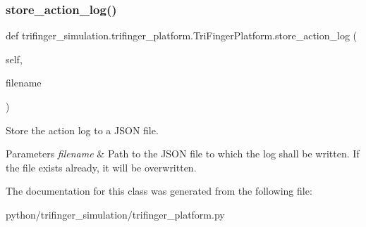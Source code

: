 \subsubsection{\texorpdfstring{store\+\_\+action\+\_\+log()}{store\_action\_log()}}
{\footnotesize\ttfamily def trifinger\+\_\+simulation.\+trifinger\+\_\+platform.\+Tri\+Finger\+Platform.\+store\+\_\+action\+\_\+log (\begin{DoxyParamCaption}\item[{}]{self,  }\item[{}]{filename }\end{DoxyParamCaption})}



Store the action log to a J\+S\+ON file. 


\begin{DoxyParams}{Parameters}
{\em filename} & Path to the J\+S\+ON file to which the log shall be written. If the file exists already, it will be overwritten. \\
\hline
\end{DoxyParams}


The documentation for this class was generated from the following file\+:\begin{DoxyCompactItemize}
\item 
python/trifinger\+\_\+simulation/trifinger\+\_\+platform.\+py\end{DoxyCompactItemize}
